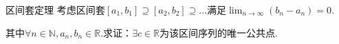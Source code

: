 \begin{comment}
\begin{proof}[完备性证明]
    考虑实数域中的柯西序列\(\{x_k\}, x_k \in \mathbb{R}\)，其中\(x_k=[\{a_i^k\}], a_i^k \in \mathbb{Q}\).

    设\(x_m=[\{a_i^m\}], x_n=[\{a_i^n\}] \in \mathbb{R}\)，定义实数度量\(d(x_m,x_n)=\lim_{i \to \infty}\abs*{a_i^m-a_i^n}\).

    设有理序列\(\{c_n\}\)满足\(c_n=a_n^n\)，下证\(\{c_n\}\)是柯西序列且\(\lim_{n \to \infty}x_n=[\{c_n\}]\).

    {\kaishu 有理数列内的柯西性}表明\(\forall \varepsilon>0, k \in \mathbb{N}, \exists N_k \in \mathbb{N}, \forall i>N_k, \abs*{a_i^k-a_{N_k}^k}<\varepsilon/3\).

    {\kaishu 有理数列间的柯西性}表明\(\forall \varepsilon>0, \exists N_1 \in \mathbb{N}, \forall m,n>N_1, d(x_m,x_n)<\varepsilon/3\).

    这等价于\(\lim_{i \to \infty}\abs*{a_i^m-a_i^n}<\varepsilon/3\)，故\(\forall \varepsilon>0, \exists N_2 \in \mathbb{N}, \forall i>N_2, \abs*{a_i^m-a_i^n}<\varepsilon/3\).

    因此\(\forall m,n>N=\max\{N_1,N_2,N_m,N_n\}, \abs*{c_m-c_n}=\abs*{a_m^m-a_n^n}<\varepsilon\)，如下：
    \begin{align*}
        \abs*{a_m^m-a_n^n} \leq \abs*{a_m^m-a_N^m}+\abs*{a_N^m-a_N^n}+\abs*{a_n^n-a_N^n}<\varepsilon/3+\varepsilon/3+\varepsilon/3=\varepsilon 
    \end{align*}
    下证\(\lim_{n \to \infty}x_n=[\{c_n\}]\)，利用{\kaishu 有理数列间的柯西性}，有
    \begin{align*}
        \forall \varepsilon>0, \exists N, \forall i,j>N, \abs*{a_i^i-a_i^j} \leq \abs*{a_i^i-a_i^N}+\abs*{a_i^N-a_i^j}
        <\varepsilon/2+\varepsilon/2=\varepsilon
    \end{align*}
    {\kaishu 因此任意实数域中的柯西序列在域中的收敛，即实数域具有完备性.}
\end{proof}
\end{comment}

\newpage

\begin{theorem}\label{1.A.2} 区间套定理 \:
    考虑区间套\([a_1,b_1] \supseteq [a_2,b_2] \supseteq \dots\)满足\(\lim_{n \to \infty}(b_n-a_n)=0\).

    其中\(\forall n \in \mathbb{N}, a_n,b_n \in \mathbb{R}\).求证：\(\exists c \in \mathbb{R}\)为该区间序列的唯一公共点.
\end{theorem}


